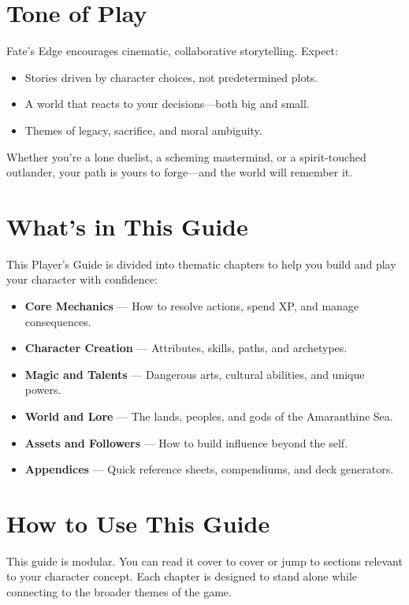\section*{Tone of Play}

Fate's Edge encourages cinematic, collaborative storytelling. Expect:
\begin{itemize}
  \item Stories driven by character choices, not predetermined plots.
  \item A world that reacts to your decisions—both big and small.
  \item Themes of legacy, sacrifice, and moral ambiguity.
\end{itemize}

Whether you're a lone duelist, a scheming mastermind, or a spirit-touched outlander, your path is yours to forge—and the world will remember it.

\section*{What's in This Guide}

This Player's Guide is divided into thematic chapters to help you build and play your character with confidence:

\begin{itemize}
  \item \textbf{Core Mechanics} — How to resolve actions, spend XP, and manage consequences.
  \item \textbf{Character Creation} — Attributes, skills, paths, and archetypes.
  \item \textbf{Magic and Talents} — Dangerous arts, cultural abilities, and unique powers.
  \item \textbf{World and Lore} — The lands, peoples, and gods of the Amaranthine Sea.
  \item \textbf{Assets and Followers} — How to build influence beyond the self.
  \item \textbf{Appendices} — Quick reference sheets, compendiums, and deck generators.
\end{itemize}

\section*{How to Use This Guide}

This guide is modular. You can read it cover to cover or jump to sections relevant to your character concept. Each chapter is designed to stand alone while connecting to the broader themes of the game.

